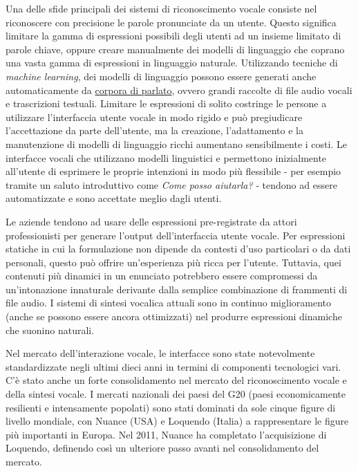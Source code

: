 \documentclass[]{../../metanetpaper}
\begin{document}
\begin{multicols}{2}
Una delle sfide principali dei sistemi di riconoscimento vocale consiste nel riconoscere con precisione le parole pronunciate da un utente. Questo significa limitare la gamma di espressioni possibili degli utenti ad un insieme limitato di parole chiave, oppure creare manualmente dei modelli di linguaggio che coprano una vasta gamma di espressioni in linguaggio naturale. Utilizzando tecniche di \emph{machine learning}, dei modelli di linguaggio possono essere generati anche automaticamente da \underline{corpora di parlato}, ovvero grandi raccolte di file audio vocali e trascrizioni testuali. Limitare le espressioni di solito costringe le persone a utilizzare l'interfaccia utente vocale in modo rigido e pu\`{o} pregiudicare l'accettazione da parte dell'utente, ma la creazione, l'adattamento e la manutenzione di modelli di linguaggio ricchi aumentano sensibilmente i costi. Le interfacce vocali che utilizzano modelli linguistici e permettono inizialmente all'utente di esprimere le proprie intenzioni in modo pi\`{u} flessibile - per esempio tramite un saluto introduttivo come \emph{Come posso aiutarla?} - tendono ad essere automatizzate e sono accettate meglio dagli utenti.

Le aziende tendono ad usare delle espressioni pre-registrate da attori professionisti per generare l'output dell'interfaccia utente vocale. Per  espressioni statiche in cui la formulazione non dipende da contesti d'uso particolari o da dati personali, questo pu\`{o} offrire un'esperienza pi\`{u} ricca per l'utente. Tuttavia, quei contenuti pi\`{u} dinamici in un enunciato potrebbero essere compromessi da un'intonazione innaturale derivante dalla semplice combinazione di frammenti di file audio. I sistemi di sintesi vocalica attuali sono in continuo miglioramento (anche se possono essere ancora ottimizzati) nel produrre espressioni dinamiche che suonino naturali.

Nel mercato dell'interazione vocale, le interfacce sono state notevolmente standardizzate negli ultimi dieci anni in termini di componenti tecnologici vari. C'\`{e} stato anche un forte consolidamento nel mercato del riconoscimento vocale e della sintesi vocale. I mercati nazionali dei paesi del G20 (paesi economicamente resilienti e intensamente popolati) sono stati dominati da sole cinque figure di livello mondiale, con Nuance (USA) e Loquendo (Italia) a rappresentare le figure pi\`{u} importanti in Europa. Nel 2011, Nuance ha completato l'acquisizione di Loquendo, definendo cos\`{i} un ulteriore passo avanti nel consolidamento del mercato.


\end{multicols}
\end{document}

